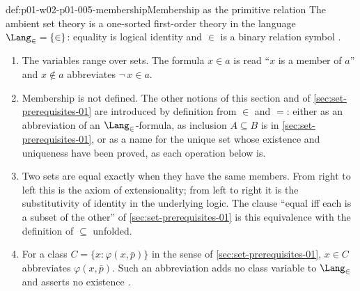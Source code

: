\begin{hbconvention}{def:p01-w02-p01-005-membership}{Membership as the primitive relation}
The ambient set theory is a one-sorted first-order theory in the language
\(\Lang_{\in}=\{\in\}\): equality is logical identity and \(\in\) is a binary
relation symbol \cite[ch.~``The Axioms of ZF and ZFC'', paragraph before
sec.~``The language and the axiom schemas'']{FrozenFormalLogicSetOperations}.
\begin{enumerate}
  \item The variables range over sets. The formula \(x\in a\) is read
        ``\(x\) is a member of \(a\)'' and \(x\notin a\) abbreviates
        \(\neg\,x\in a\).
  \item Membership is not defined. The other notions of this section and of
        \cref{sec:set-prerequisites-01} are introduced by definition from
        \(\in\) and \(=\): either as an
        abbreviation of an \(\Lang_{\in}\)-formula, as inclusion
        \(A\subseteq B\) is in \cref{sec:set-prerequisites-01}, or as a name
        for the unique set whose existence and uniqueness have been proved, as
        each operation below is.
  \item Two sets are equal exactly when they have the same members. From
        right to left this is the axiom of extensionality; from left to right
        it is the substitutivity of identity in the underlying logic. The
        clause ``equal iff each is a subset of the other'' of
        \cref{sec:set-prerequisites-01} is this equivalence with the definition
        of \(\subseteq\) unfolded.
  \item For a class \(C=\{x:\varphi(x,\bar p)\}\) in the sense of
        \cref{sec:set-prerequisites-01}, \(x\in C\) abbreviates
        \(\varphi(x,\bar p)\). Such an abbreviation adds no class variable to
        \(\Lang_{\in}\) and asserts no existence
        \cite[ch.~``The Axioms of ZF and ZFC'', convention
        ``Classes'']{FrozenFormalLogicSetOperations}.
\end{enumerate}
\end{hbconvention}

